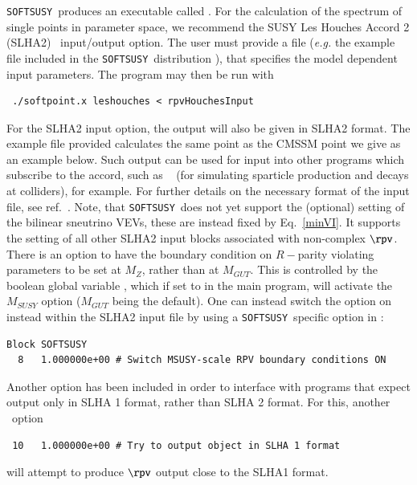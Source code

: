 \documentclass[final,3p,times,pdflatex]{elsarticle}
\def\SOFTSUSY{{\tt SOFTSUSY}}
\begin{document}
\SOFTSUSY~produces an executable called . For the calculation
of the spectrum of single points in parameter space, we recommend the
SUSY Les Houches Accord 2 (SLHA2)~\cite{Allanach:2008qq}  input/output
option. The user must provide a file (\textit{e.g.} the example file included
in the \SOFTSUSY~distribution
), that specifies the model dependent input
parameters. The program may then be run with
\small
\begin{verbatim}
 ./softpoint.x leshouches < rpvHouchesInput
\end{verbatim}
\normalsize
For the SLHA2 input option, 
the output will also be given in 
SLHA2 format. The example file provided calculates the same point as the
CMSSM point we give as an example below. Such output can be used for
input into other programs which subscribe to the accord, such as
~\cite{Sjostrand:2007gs} (for
simulating sparticle production and decays at colliders), for example. For
further details on the necessary format of 
the input file, see ref.~\cite{Allanach:2008qq}. Note, that \SOFTSUSY~does not
yet support the (optional) setting of the bilinear sneutrino VEVs, 
these are instead fixed by Eq.~\ref{minVI}. It supports 
the setting of all other SLHA2 input blocks associated with non-complex $\rpv$. 
There is an option to have the boundary condition on $R-$parity violating
parameters to be set at $M_Z$, rather than at $M_{GUT}$. This is controlled by
the boolean global variable , which if set to 
in the main program, will activate the $M_{SUSY}$ option ($M_{GUT}$ being the
default). One can instead switch the option on instead within the SLHA2 input
file by using a \SOFTSUSY~specific option in :
\begin{verbatim}
Block SOFTSUSY
  8   1.000000e+00 # Switch MSUSY-scale RPV boundary conditions ON
\end{verbatim}
Another option has been included in order to interface with programs that
expect output only in SLHA 1 format, rather than SLHA 2 format. For this,
another ~option
\begin{verbatim}
 10   1.000000e+00 # Try to output object in SLHA 1 format 
\end{verbatim}
will attempt to produce $\rpv$ output close to the SLHA1 format. 
\end{document}
